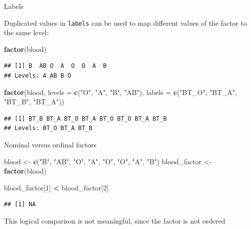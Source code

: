 \documentclass[ignorenonframetext,]{beamer}
\newenvironment{Shaded}{\begin{snugshade}}{\end{snugshade}}
\newcommand{\DataTypeTok}[1]{\textcolor[rgb]{0.13,0.29,0.53}{#1}}
\newcommand{\DecValTok}[1]{\textcolor[rgb]{0.00,0.00,0.81}{#1}}
\newcommand{\KeywordTok}[1]{\textcolor[rgb]{0.13,0.29,0.53}{\textbf{#1}}}
\newcommand{\NormalTok}[1]{#1}
\newcommand{\OperatorTok}[1]{\textcolor[rgb]{0.81,0.36,0.00}{\textbf{#1}}}
\newcommand{\StringTok}[1]{\textcolor[rgb]{0.31,0.60,0.02}{#1}}
\begin{document}
\begin{frame}[fragile]{Labels}
\protect\hypertarget{labels}{}

Duplicated values in \texttt{labels} can be used to map different values
of the factor to the same level:

\begin{Shaded}
\begin{Highlighting}[]
\KeywordTok{factor}\NormalTok{(blood)}
\end{Highlighting}
\end{Shaded}

\begin{verbatim}
## [1] B  AB O  A  O  O  A  B 
## Levels: A AB B O
\end{verbatim}

\begin{Shaded}
\begin{Highlighting}[]
\KeywordTok{factor}\NormalTok{(blood,}
         \DataTypeTok{levels =} \KeywordTok{c}\NormalTok{(}\StringTok{"O"}\NormalTok{, }\StringTok{"A"}\NormalTok{, }\StringTok{"B"}\NormalTok{, }\StringTok{"AB"}\NormalTok{),}
         \DataTypeTok{labels =} \KeywordTok{c}\NormalTok{(}\StringTok{"BT_O"}\NormalTok{, }\StringTok{"BT_A"}\NormalTok{, }\StringTok{"BT_B"}\NormalTok{, }\StringTok{"BT_A"}\NormalTok{))}
\end{Highlighting}
\end{Shaded}

\begin{verbatim}
## [1] BT_B BT_A BT_O BT_A BT_O BT_O BT_A BT_B
## Levels: BT_O BT_A BT_B
\end{verbatim}

\end{frame}

\begin{frame}[fragile]{Nominal versus ordinal factors}
\protect\hypertarget{nominal-versus-ordinal-factors}{}

\begin{Shaded}
\begin{Highlighting}[]
\NormalTok{blood <-}\StringTok{ }\KeywordTok{c}\NormalTok{(}\StringTok{"B"}\NormalTok{, }\StringTok{"AB"}\NormalTok{, }\StringTok{"O"}\NormalTok{, }\StringTok{"A"}\NormalTok{, }\StringTok{"O"}\NormalTok{, }\StringTok{"O"}\NormalTok{, }\StringTok{"A"}\NormalTok{, }\StringTok{"B"}\NormalTok{) }
\NormalTok{blood_factor <-}\StringTok{ }\KeywordTok{factor}\NormalTok{(blood)}

\NormalTok{blood_factor[}\DecValTok{1}\NormalTok{] }\OperatorTok{<}\StringTok{ }\NormalTok{blood_factor[}\DecValTok{2}\NormalTok{]}
\end{Highlighting}
\end{Shaded}

\begin{verbatim}
## [1] NA
\end{verbatim}

This logical comparison is not meaningful, since the factor is not
ordered

\end{frame}
\end{document}
